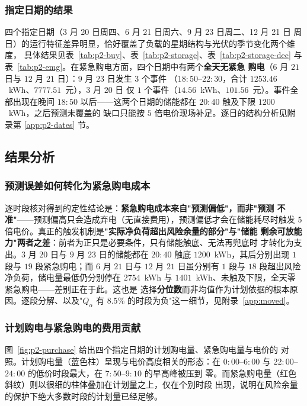 \documentclass[withoutpreface,bwprint]{cumcmthesis}
\begin{document}


\subsubsection{指定日期的结果}

四个指定日期（3 月 20 日周四、6 月 21 日周六、9 月 23 日周二、12 月 21 日
周日）的运行特征差异明显，恰好覆盖了负载的星期结构与光伏的季节变化两个维度，
具体结果见表~\ref{tab:p2-buy}、表~\ref{tab:p2-storage}、表~\ref{tab:p2-storage-dec}
与表~\ref{tab:p2-emg}。在紧急购电方面，四个日期中有两个\textbf{全天无紧急
购电}（$6$ 月 $21$ 日与 $12$ 月 $21$ 日）：$9$ 月 $23$ 日发生 $3$ 个事件
（$18{:}50$--$22{:}30$，合计 $1253.46$~kWh、$7777.51$~元），$3$ 月 $20$ 日
仅 $1$ 个事件（$14.56$~kWh、$101.56$~元）。事件全部出现在晚间 $18{:}50$
以后——这两个日期的储能都在 $20{:}40$ 触及下限 $1200$~kWh，之后预测未覆盖的
缺口只能按 $5$ 倍电价现场补足。逐日的结构分析见附录第 \ref{app:p2-dates} 节。
\subsection{结果分析}

\subsubsection{预测误差如何转化为紧急购电成本}

逐时段核对得到的定性结论是：\textbf{紧急购电成本来自"预测偏低"，而非"预测
不准"}——预测偏高只会造成弃电（无直接费用），预测偏低才会在储能耗尽时触发
$5$ 倍电价。真正的触发机制是\textbf{"实际净负荷超出风险余量的部分"与"储能
剩余可放能力"两者之差}：前者为正只是必要条件，只有储能触底、无法再兜底时
才转化为支出。$3$ 月 $20$ 日与 $9$ 月 $23$ 日的储能都在 $20{:}40$ 触底
$1200$~kWh，其后分别出现 $1$ 段与 $19$ 段紧急购电；而 $6$ 月 $21$ 日与
$12$ 月 $21$ 日虽分别有 $1$ 段与 $18$ 段超出风险净负荷，储电量最低仍分别停在
$2754$~kWh 与 $1401$~kWh、未触及下限，全天零紧急购电——差别正在于此。这也是
选择\textbf{分位数}而非均值作为计划依据的根本原因。逐段分解、以及"$Q_{\alpha}$
有 $8.5\%$ 的时段为负"这一细节，见附录~\ref{app:moved}。

\subsubsection{计划购电与紧急购电的费用贡献}

图~\ref{fig:p2-purchase} 给出四个指定日期的计划购电量、紧急购电量与电价的
对照。计划购电量（蓝色柱）呈现与电价高度相关的形态：在 $0{:}00$--$6{:}00$
与 $22{:}00$--$24{:}00$ 的低价时段最大，在 $7{:}50$--$9{:}10$ 的早高峰被压到
零。而紧急购电量（红色斜纹）则以很细的柱体叠加在计划量之上，仅在个别时段
出现，说明在风险余量的保护下绝大多数时段的计划量已经足够。
\end{document}
